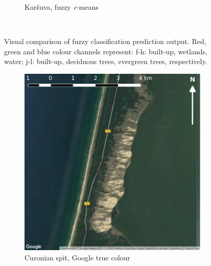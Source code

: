 \documentclass[a4paper,12pt]{scrbook}
\begin{document}
\begin{figure}
\begin{subfigure}[t]{.23\textwidth}
    \caption{Kar\v{s}uva, fuzzy \textit{c}-means}
    \label{subfig-karsuva-cm}
  \end{subfigure} \
  \caption{Visual comparison of fuzzy classification prediction output. Red, green and blue colour channels represent: f-h: built-up, wetlands, water; j-l: built-up, deciduous trees, evergreen trees, respectively.}
\end{figure}

\begin{figure}
  \ContinuedFloat
  \centering
  \begin{subfigure}[t]{.23\textwidth}
    \includegraphics[width=\textwidth]{thesis-figures/figures-qgis/kursiunerija-google}
    \caption{Curonian spit, Google true colour}
  \end{subfigure} \hfill
  \begin{subfigure}[t]{.23\textwidth}

\end{subfigure}
\end{figure}
\end{document}
